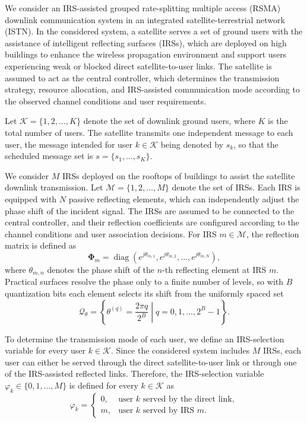 \documentclass[12pt,onecolumn]{IEEEtran}
\begin{document}
We consider an IRS-assisted grouped rate-splitting multiple access (RSMA) downlink communication system in an integrated satellite-terrestrial network (ISTN). 
In the considered system, a satellite serves a set of ground users with the assistance of intelligent reflecting surfaces (IRSs), which are deployed on high buildings to enhance the wireless propagation environment and support users experiencing weak or blocked direct satellite-to-user links. 
The satellite is assumed to act as the central controller, which determines the transmission strategy, resource allocation, and IRS-assisted communication mode according to the observed channel conditions and user requirements.

Let $\mathcal{K}=\{1,2,\ldots,K\}$ denote the set of downlink ground users, where $K$ is the total number of users. 
The satellite transmits one independent message to each user, the message intended for
user $k \in \mathcal{K}$ being denoted by $s_k$, so that the scheduled message set is
$s=\{s_1,\ldots,s_K\}$.

We consider $M$ IRSs deployed on the rooftops of buildings to assist the satellite downlink transmission. 
Let $\mathcal{M}=\{1,2,\ldots,M\}$ denote the set of IRSs. 
Each IRS is equipped with $N$ passive reflecting elements, which can independently adjust the phase shift of the incident signal. 
The IRSs are assumed to be connected to the central controller, and their reflection coefficients are configured according to the channel conditions and user association decisions. For IRS $m \in \mathcal{M}$, the reflection matrix is defined as
\begin{equation}
    \boldsymbol{\Phi}_m
    =
    \operatorname{diag}
    \left(
    e^{j\theta_{m,1}},
    e^{j\theta_{m,2}},
    \ldots,
    e^{j\theta_{m,N}}
    \right),
\end{equation}
where $\theta_{m,n}$ denotes the phase shift of the $n$-th reflecting element at IRS $m$. Practical surfaces resolve the phase only to a finite number of levels, so with $B$
quantization bits each element selects its shift from the uniformly spaced
set~\cite{peng2025robust,han2025weighted}
\begin{equation}
    \mathcal{Q}_{\theta}
    =
    \left\{\left. \theta^{(q)} = \frac{2\pi q}{2^{B}} \;\right|\;
    q = 0,1,\ldots,2^{B}-1 \right\}.
\end{equation}

To determine the transmission mode of each user, we define an IRS-selection variable for every user $k \in \mathcal{K}$. 
Since the considered system includes $M$ IRSs, each user can either be served through the direct satellite-to-user link or through one of the IRS-assisted reflected links. 
Therefore, the IRS-selection variable $\varphi_k \in \{0,1,\ldots,M\}$ is defined for every
$k \in \mathcal{K}$ as
\begin{equation}
    \varphi_k =
    \begin{cases}
        0, & \text{user } k \text{ served by the direct link},\\
        m, & \text{user } k \text{ served by IRS } m.
    \end{cases}
\end{equation}
\end{document}
